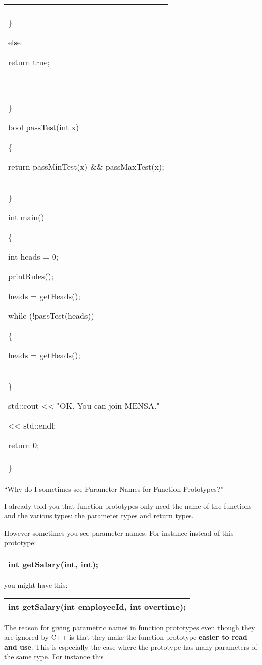 \documentclass[
]{article}
\begin{document}
\begin{longtable}[]{@{}l@{}}
\begin{minipage}[t]{0.97\columnwidth}
return false;\\
\}

else

return true;\\
~\\
\}

bool passTest(int x)

\{

return passMinTest(x) \&\& passMaxTest(x);\\
\}

int main()

\{

int heads = 0;

printRules();

heads = getHeads();

while (!passTest(heads))

\{

heads = getHeads();\\
\}

std::cout \textless\textless{} "OK. You can join MENSA."

\textless\textless{} std::endl;

return 0;\\
\}\strut
\end{minipage}\tabularnewline
\bottomrule
\end{longtable}

``Why do I sometimes see Parameter Names for Function Prototypes?''

I already told you that function prototypes only need the name of the
functions and the various types: the parameter types and return types.

However sometimes you see parameter names. For instance instead of this
prototype:

\begin{longtable}[]{@{}l@{}}
\toprule
\endhead
int getSalary(int, int);\tabularnewline
\bottomrule
\end{longtable}

you might have this:

\begin{longtable}[]{@{}l@{}}
\toprule
\endhead
int getSalary(int employeeId, int overtime);\tabularnewline
\bottomrule
\end{longtable}

The reason for giving parametric names in function prototypes even
though they are ignored by C++ is that they make the function prototype
\textbf{easier to read and use}. This is especially the case where the
prototype has many parameters of the same type. For instance this
\end{document}

